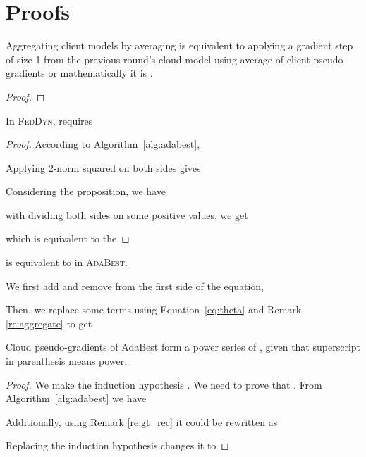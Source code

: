\documentclass[runningheads]{llncs}
\def\eqref#1{Equation~\ref{#1}}
\def\algref#1{Algorithm~\ref{#1}}
\newcommand{\feddyn}{\textsc{FedDyn}\xspace}
\newcommand{\ours}{\textsc{AdaBest}\xspace}
\begin{document}
\section{Proofs}

\begin{remark}
Aggregating client models by averaging is equivalent to applying a gradient step of size 1 from the previous round's cloud model using average of client pseudo-gradients or mathematically it is .
\end{remark}
\begin{proof}

\end{proof}



\vspace{0.6cm}
\begin{theorem}
In \feddyn,  requires


\end{theorem}


\begin{proof}
According to \algref{alg:adabest},

Applying 2-norm squared on both sides gives

Considering the proposition, we have

with dividing both sides on some positive values, we get

which is equivalent to the 



\end{proof}


\vspace{0.6cm}
\begin{remark}
 is equivalent to  in \ours.
\end{remark}
We first add and remove  from the first side of the equation,

Then, we replace some terms using \eqref{eq:theta} and Remark \ref{re:aggregate} to get


\vspace{0.6cm}
\begin{remark}
Cloud pseudo-gradients of AdaBest form a power series of , given that superscript in parenthesis means power.
\end{remark}
\begin{proof}
We make the induction hypothesis . We need to prove that . 
From \algref{alg:adabest} we have

Additionally, using Remark \ref{re:gt_rec} it could be rewritten as

Replacing the induction hypothesis changes it to



\end{proof}
\end{document}

